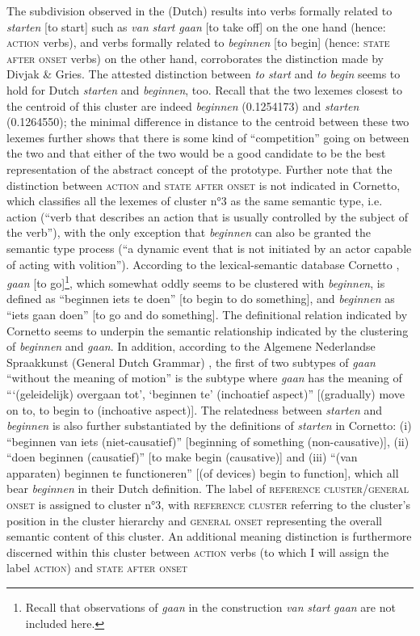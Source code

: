 The subdivision observed in the (Dutch) results into verbs formally related to \textit{starten} [to start] such as \textit{van} \textit{start} \textit{gaan} [to take off] on the one hand (hence: \textsc{action} verbs), and verbs formally related to \textit{beginnen} [to begin] (hence: \textsc{state after onset} verbs) on the other hand, corroborates the distinction made by Divjak \& Gries. The attested distinction between \textit{to} \textit{start} and \textit{to} \textit{begin} seems to hold for Dutch \textit{starten} and \textit{beginnen}, too. Recall that the two lexemes closest to the centroid of this cluster are indeed \textit{beginnen} (0.1254173) and \textit{starten} (0.1264550); the minimal difference in distance to the centroid between these two lexemes further shows that there is some kind of ``competition'' going on between the two and that either of the two would be a good candidate to be the best representation of the abstract concept of the prototype. Further note that the distinction between \textsc{action} and \textsc{state after onset} is not indicated in Cornetto, which classifies all the lexemes of cluster n°3 as the same semantic type, i.e. action (“verb that describes an action that is usually controlled by the subject of the verb”), with the only exception that \textit{beginnen} can also be granted the semantic type process (“a dynamic event that is not initiated by an actor capable of acting with volition”). According to the lexical-semantic database Cornetto \citep{vossen_cornetto_2008}, \textit{gaan} [to go]\footnote{Recall that observations of \textit{gaan} in the construction \textit{van} \textit{start} \textit{gaan} are not included here.}, which somewhat oddly seems to be clustered with \textit{beginnen}, is defined as “beginnen iets te doen” [to begin to do something], and \textit{beginnen} as “iets gaan doen” [to go and do something]. The definitional relation indicated by Cornetto seems to underpin the semantic relationship indicated by the clustering of \textit{beginnen} and \textit{gaan}. In addition, according to the Algemene Nederlandse Spraakkunst (General Dutch Grammar) \citep{haeseryn_algemene_2012}, the first of two subtypes of \textit{gaan} “without the meaning of motion” is the subtype where \textit{gaan} has the meaning of “‘(geleidelijk) overgaan tot’, ‘beginnen te’ (inchoatief aspect)” [(gradually) move on to, to begin to (inchoative aspect)]. The relatedness between \textit{starten} and \textit{beginnen} is also further substantiated by the definitions of \textit{starten} in Cornetto: (i) “beginnen van iets (niet-causatief)” [beginning of something (non-causative)], (ii) “doen beginnen (causatief)” [to make begin (causative)] and (iii) “(van apparaten) beginnen te functioneren” [(of devices) begin to function], which all bear \textit{beginnen} in their Dutch definition. The label of \textsc{reference cluster}\slash \textsc{general onset} is assigned to cluster n°3, with \textsc{reference cluster} referring to the cluster’s position in the cluster hierarchy and \textsc{general onset} representing the overall semantic content of this cluster. An additional meaning distinction is furthermore discerned within this cluster between \textsc{action} verbs (to which I will assign the label \textsc{action}) and \textsc{state after onset} 